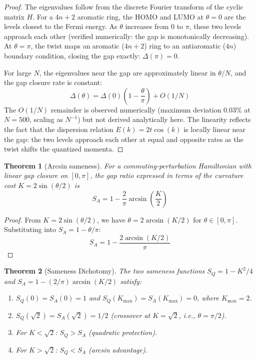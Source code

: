 \documentclass[11pt,letterpaper]{article}
\newtheorem{theorem}{Theorem}[section]
\begin{document}
\begin{proof}
The eigenvalues follow from the discrete Fourier transform of the cyclic matrix $H$. For a $4n+2$ aromatic ring, the HOMO and LUMO at $\theta = 0$ are the levels closest to the Fermi energy. As $\theta$ increases from $0$ to $\pi$, these two levels approach each other (verified numerically: the gap is monotonically decreasing). At $\theta = \pi$, the twist maps an aromatic ($4n+2$) ring to an antiaromatic ($4n$) boundary condition, closing the gap exactly: $\Delta(\pi) = 0$.

For large $N$, the eigenvalues near the gap are approximately linear in $\theta/N$, and the gap closure rate is constant:
\begin{equation}
\Delta(\theta) = \Delta(0)\left(1 - \frac{\theta}{\pi}\right) + O(1/N)
\end{equation}
The $O(1/N)$ remainder is observed numerically (maximum deviation $0.03\%$ at $N = 500$, scaling as $N^{-1}$) but not derived analytically here. The linearity reflects the fact that the dispersion relation $E(k) = 2t\cos(k)$ is locally linear near the gap: the two levels approach each other at equal and opposite rates as the twist shifts the quantized momenta.
\end{proof}

\begin{theorem}[Arcsin sameness]\label{thm:arcsin}
For a commuting-perturbation Hamiltonian with linear gap closure on $[0, \pi]$, the gap ratio expressed in terms of the curvature cost $K = 2\sin(\theta/2)$ is
\begin{equation}
S_A = 1 - \frac{2}{\pi}\arcsin\left(\frac{K}{2}\right)
\end{equation}
\end{theorem}

\begin{proof}
From $K = 2\sin(\theta/2)$, we have $\theta = 2\arcsin(K/2)$ for $\theta \in [0, \pi]$. Substituting into $S_A = 1 - \theta/\pi$:
\begin{equation}
S_A = 1 - \frac{2\arcsin(K/2)}{\pi}
\end{equation}
\end{proof}

\begin{theorem}[Sameness Dichotomy]\label{thm:dichotomy}
The two sameness functions $S_Q = 1 - K^2/4$ and $S_A = 1 - (2/\pi)\arcsin(K/2)$ satisfy:
\begin{enumerate}[label=(\roman*),nosep]
\item $S_Q(0) = S_A(0) = 1$ and $S_Q(K_{\max}) = S_A(K_{\max}) = 0$, where $K_{\max} = 2$.
\item $S_Q(\sqrt{2}) = S_A(\sqrt{2}) = 1/2$ (crossover at $K = \sqrt{2}$, i.e., $\theta = \pi/2$).
\item For $K < \sqrt{2}$: $S_Q > S_A$ (quadratic protection).
\item For $K > \sqrt{2}$: $S_Q < S_A$ (arcsin advantage).
\end{enumerate}
\end{theorem}
\end{document}

